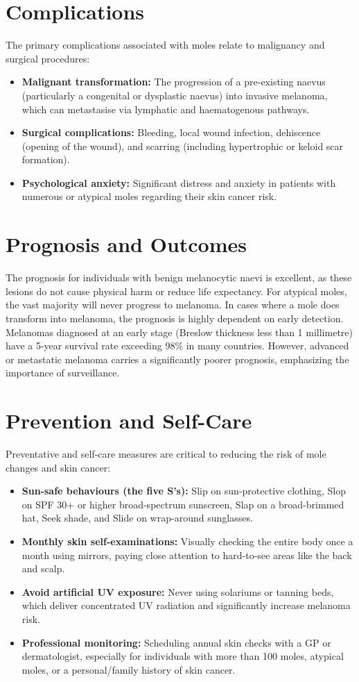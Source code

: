 \section*{Complications}
The primary complications associated with moles relate to malignancy and surgical procedures:
\begin{itemize}
    \item \textbf{Malignant transformation:} The progression of a pre-existing naevus (particularly a congenital or dysplastic naevus) into invasive melanoma, which can metastasise via lymphatic and haematogenous pathways.
    \item \textbf{Surgical complications:} Bleeding, local wound infection, dehiscence (opening of the wound), and scarring (including hypertrophic or keloid scar formation).
    \item \textbf{Psychological anxiety:} Significant distress and anxiety in patients with numerous or atypical moles regarding their skin cancer risk.
\end{itemize}

\section*{Prognosis and Outcomes}
The prognosis for individuals with benign melanocytic naevi is excellent, as these lesions do not cause physical harm or reduce life expectancy. For atypical moles, the vast majority will never progress to melanoma. In cases where a mole does transform into melanoma, the prognosis is highly dependent on early detection. Melanomas diagnosed at an early stage (Breslow thickness less than 1 millimetre) have a 5-year survival rate exceeding 98\% in many countries. However, advanced or metastatic melanoma carries a significantly poorer prognosis, emphasizing the importance of surveillance.

\section*{Prevention and Self-Care}
Preventative and self-care measures are critical to reducing the risk of mole changes and skin cancer:
\begin{itemize}
    \item \textbf{Sun-safe behaviours (the five S's):} Slip on sun-protective clothing, Slop on SPF 30+ or higher broad-spectrum sunscreen, Slap on a broad-brimmed hat, Seek shade, and Slide on wrap-around sunglasses.
    \item \textbf{Monthly skin self-examinations:} Visually checking the entire body once a month using mirrors, paying close attention to hard-to-see areas like the back and scalp.
    \item \textbf{Avoid artificial UV exposure:} Never using solariums or tanning beds, which deliver concentrated UV radiation and significantly increase melanoma risk.
    \item \textbf{Professional monitoring:} Scheduling annual skin checks with a GP or dermatologist, especially for individuals with more than 100 moles, atypical moles, or a personal/family history of skin cancer.
\end{itemize}

